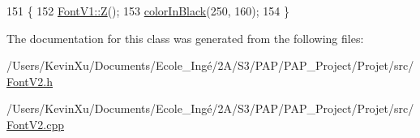 \begin{DoxyCode}
151                \{
152     \mbox{\hyperlink{class_font_v1_a10df574bc5aa14a43988d42db4e89504}{FontV1::Z}}();
153     \mbox{\hyperlink{class_font_v2_a04f2501961bc286ce70fbb6a840b0e8a}{colorInBlack}}(250, 160);
154 \}
\end{DoxyCode}


The documentation for this class was generated from the following files\+:\begin{DoxyCompactItemize}
\item 
/\+Users/\+Kevin\+Xu/\+Documents/\+Ecole\+\_\+\+Ingé/2\+A/\+S3/\+P\+A\+P/\+P\+A\+P\+\_\+\+Project/\+Projet/src/\mbox{\hyperlink{_font_v2_8h}{Font\+V2.\+h}}\item 
/\+Users/\+Kevin\+Xu/\+Documents/\+Ecole\+\_\+\+Ingé/2\+A/\+S3/\+P\+A\+P/\+P\+A\+P\+\_\+\+Project/\+Projet/src/\mbox{\hyperlink{_font_v2_8cpp}{Font\+V2.\+cpp}}\end{DoxyCompactItemize}
